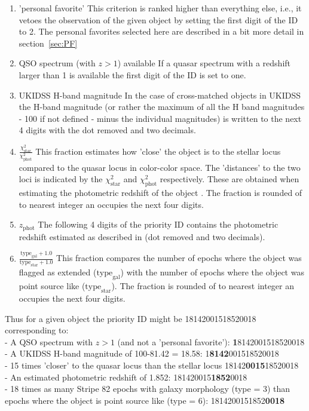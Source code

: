 \documentclass[a4paper,11pt]{article}
\begin{document}
\begin{enumerate}

\item 'personal favorite'
\subitem This criterion is ranked higher than everything else, i.e., it vetoes
the observation of the given object by setting the first digit of the ID to 2.
The personal favorites selected here are described in a bit more detail in
section~\ref{sec:PF}

\item QSO spectrum  (with $z>1$) available
\subitem If a quasar spectrum with a redshift larger than 1 is available the
first digit of the ID is set to one.

\item UKIDSS H-band magnitude
\subitem In the case of cross-matched objects in UKIDSS the H-band magnitude
(or rather the maximum of all the H band magnitudes - 100 if not defined -
minus the individual magnitudes) is written to the next 4 digits with the dot
removed and two decimals.

\item  $\frac{\chi_\textrm{star}^2}{\chi_\textrm{phot}^2}$
\subitem This fraction estimates how 'close' the object is to the stellar
locus compared to the quasar locus in color-color space. The 'distances' to
the two loci is indicated by the $\chi_\textrm{star}^2$ and
$\chi_\textrm{phot}^2$ respectively. These are obtained when estimating the
photometric redshift of the object \citep[see][for more details]{hennawi10}.
The fraction is rounded of to nearest integer an occupies the next four
digits.

\item $z_\textrm{phot}$ 
\subitem The following 4 digits of the priority ID contains the photometric
redshift estimated as described in \cite{hennawi10} (dot removed and two
decimals).

\item $\frac{\textrm{type}_\textrm{gal}+1.0}{\textrm{type}_\textrm{star}+1.0}$
\subitem This fraction compares the number of epochs where the object was
flagged as extended ($\textrm{type}_\textrm{gal}$) with the number of epochs
where the object was point source like ($\textrm{type}_\textrm{star}$). The
fraction is rounded of to nearest integer an occupies the next four digits.

\end{enumerate}

Thus for a given object the priority ID might be 18142001518520018 corresponding to:\\
- A QSO spectrum with $z>1$ (and not a 'personal favorite'): \hfill \textbf{1}8142001518520018 \\
- A UKIDSS H-band magnitude of 100-81.42 = 18.58:  \hfill 1\textbf{8142}001518520018 \\
- 15 times 'closer' to the quasar locus than the stellar locus \hfill 18142\textbf{0015}18520018\\
- An estimated photometric redshift of 1.852: \hfill 181420015\textbf{1852}0018 \\
- 18 times as many Stripe 82 epochs with galaxy morphology (type = 3) than \\
 epochs where the object is point source like (type = 6): \hfill 1814200151852\textbf{0018}
\end{document}

